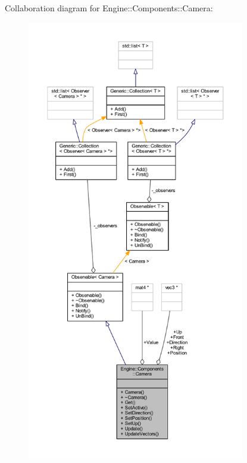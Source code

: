 Collaboration diagram for Engine\+:\+:Components\+:\+:Camera\+:
\nopagebreak
\begin{figure}[H]
\begin{center}
\leavevmode
\includegraphics[height=550pt]{classEngine_1_1Components_1_1Camera__coll__graph}
\end{center}
\end{figure}
